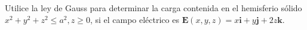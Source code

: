 \item Utilice la ley de Gauss para determinar la carga contenida en el hemisferio sólido $x^2 + y^2 + z^2 \le a^2, z \ge 0$, si el campo eléctrico es $\mathbf{E}(x, y, z) = x\mathbf{i} + y\mathbf{j} + 2z\mathbf{k}$.
